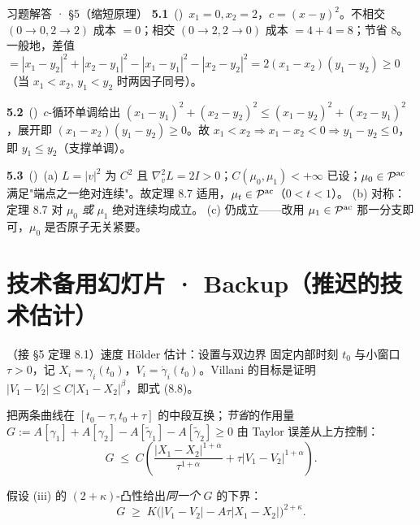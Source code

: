 \begin{frame}{习题解答 · §5（缩短原理）}
  \textbf{5.1}~(\diffI)\ $x_1=0,x_2=2$，$c=(x-y)^2$。不相交 $(0\to0,2\to2)$ 成本 $=0$；相交 $(0\to2,2\to0)$ 成本 $=4+4=8$；节省 $8$。一般地，差值 $=|x_1-y_2|^2+|x_2-y_1|^2-|x_1-y_1|^2-|x_2-y_2|^2=2(x_1-x_2)(y_1-y_2)\ge0$（当 $x_1<x_2,\,y_1<y_2$ 时两因子同号）。

  \medskip
  \textbf{5.2}~(\diffII)\ $c$-循环单调给出 $(x_1-y_1)^2+(x_2-y_2)^2\le(x_1-y_2)^2+(x_2-y_1)^2$，展开即 $(x_1-x_2)(y_1-y_2)\ge0$。故 $x_1<x_2\Rightarrow x_1-x_2<0\Rightarrow y_1-y_2\le0$，即 $y_1\le y_2$（支撑单调）。

  \medskip
  \textbf{5.3}~(\diffIII)\ (a) $L=|v|^2$ 为 $C^2$ 且 $\nabla_v^2L=2I>0$；$C(\mu_0,\mu_1)<+\infty$ 已设；$\mu_0\in\mathcal{P}^{\mathrm{ac}}$ 满足"端点之一绝对连续"。故定理 8.7 适用，$\mu_t\in\mathcal{P}^{\mathrm{ac}}$（$0<t<1$）。
  (b) 对称：定理 8.7 对 $\mu_0$ \emph{或} $\mu_1$ 绝对连续均成立。
  (c) 仍成立——改用 $\mu_1\in\mathcal{P}^{\mathrm{ac}}$ 那一分支即可，$\mu_0$ 是否原子无关紧要。

\end{frame}

\section*{技术备用幻灯片 · Backup（推迟的技术估计）}

\begin{frame}{（接 §5 定理 8.1）速度 Hölder 估计：设置与双边界}
  固定内部时刻 $t_{0}$ 与小窗口 $\tau>0$，记
  $X_{i}=\gamma_{i}(t_{0})$，$V_{i}=\dot{\gamma}_{i}(t_{0})$。Villani 的目标是证明
  $|V_{1}-V_{2}|\le C|X_{1}-X_{2}|^{\beta}$，即式 (8.8)。

  把两条曲线在 $[t_{0}-\tau,t_{0}+\tau]$ 的中段互换；\emph{节省}的作用量
  $G:=A[\gamma_{1}]+A[\gamma_{2}]-A[\widetilde{\gamma}_{1}]-A[\widetilde{\gamma}_{2}]\ge0$
  由 Taylor 误差从上方控制：
  \[
    G \;\le\;
    C\!\left(
      \frac{|X_{1}-X_{2}|^{1+\alpha}}{\tau^{1+\alpha}}
      +\tau |V_{1}-V_{2}|^{1+\alpha}
    \right).
  \]

  假设 (iii) 的 $(2+\kappa)$-凸性给出\emph{同一个} $G$ 的下界：
  \[
    G \;\ge\;
    K\bigl(|V_{1}-V_{2}|-A\tau |X_{1}-X_{2}|\bigr)^{2+\kappa}.
  \]

\end{frame}

